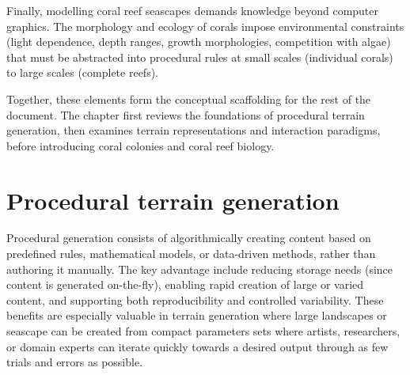 Finally, modelling coral reef seascapes demands knowledge beyond computer graphics. The morphology and ecology of corals impose environmental constraints (light dependence, depth ranges, growth morphologies, competition with algae) that must be abstracted into procedural rules at small scales (individual corals) to large scales (complete reefs).

Together, these elements form the conceptual scaffolding for the rest of the document. The chapter first reviews the foundations of procedural terrain generation, then examines terrain representations and interaction paradigms, before introducing coral colonies and coral reef biology.




\section{Procedural terrain generation}
\label{sec:state-of-the-art_procedural-generation}

Procedural generation consists of algorithmically creating content based on predefined rules, mathematical models, or data-driven methods, rather than authoring it manually. The key advantage include reducing storage needs (since content is generated on-the-fly), enabling rapid creation of large or varied content, and supporting both reproducibility and controlled variability. These benefits are especially valuable in terrain generation where large landscapes or seascape can be created from compact parameters sets where artists, researchers, or domain experts can iterate quickly towards a desired output through as few trials and errors as possible.

